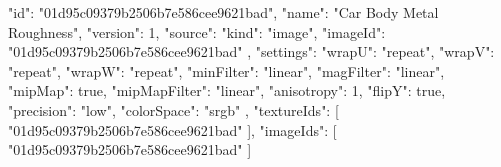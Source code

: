 {
  "id": "01d95c09379b2506b7e586cee9621bad",
  "name": "Car Body Metal Roughness",
  "version": 1,
  "source": {
    "kind": "image",
    "imageId": "01d95c09379b2506b7e586cee9621bad"
  },
  "settings": {
    "wrapU": "repeat",
    "wrapV": "repeat",
    "wrapW": "repeat",
    "minFilter": "linear",
    "magFilter": "linear",
    "mipMap": true,
    "mipMapFilter": "linear",
    "anisotropy": 1,
    "flipY": true,
    "precision": "low",
    "colorSpace": "srgb"
  },
  "textureIds": [
    "01d95c09379b2506b7e586cee9621bad"
  ],
  "imageIds": [
    "01d95c09379b2506b7e586cee9621bad"
  ]
}
